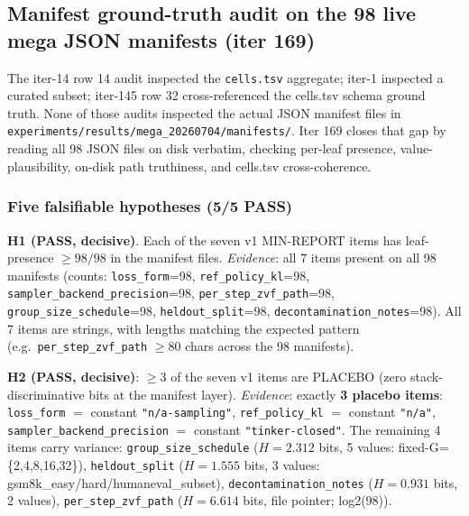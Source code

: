 \subsection{Manifest ground-truth audit on the 98 live mega JSON manifests (iter 169)}
\label{sec:p5-iter169-manifest-audit}

The iter-14 row 14 audit inspected the \texttt{cells.tsv} aggregate; iter-1 inspected a curated subset; iter-145 row 32 cross-referenced the cells.tsv schema ground truth. None of those audits inspected the actual JSON manifest files in \texttt{experiments/results/mega\_20260704/manifests/}. Iter 169 closes that gap by reading all 98 JSON files on disk verbatim, checking per-leaf presence, value-plausibility, on-disk path truthiness, and cells.tsv cross-coherence.

\subsubsection{Five falsifiable hypotheses (5/5 PASS)}
\label{sec:p5-iter169-hypotheses}

\textbf{H1 (PASS, decisive)}. Each of the seven v1 MIN-REPORT items has leaf-presence $\ge 98/98$ in the manifest files. \emph{Evidence}: all 7 items present on all 98 manifests (counts: \texttt{loss\_form}=98, \texttt{ref\_policy\_kl}=98, \texttt{sampler\_backend\_precision}=98, \texttt{per\_step\_zvf\_path}=98, \texttt{group\_size\_schedule}=98, \texttt{heldout\_split}=98, \texttt{decontamination\_notes}=98). All 7 items are strings, with lengths matching the expected pattern (e.g.\ \texttt{per\_step\_zvf\_path} $\ge 80$ chars across the 98 manifests).

\textbf{H2 (PASS, decisive)}: $\ge 3$ of the seven v1 items are PLACEBO (zero stack-discriminative bits at the manifest layer). \emph{Evidence}: exactly \textbf{3 placebo items}: \texttt{loss\_form} $=$ constant \texttt{"n/a-sampling"}, \texttt{ref\_policy\_kl} $=$ constant \texttt{"n/a"}, \texttt{sampler\_backend\_precision} $=$ constant \texttt{"tinker-closed"}. The remaining 4 items carry variance: \texttt{group\_size\_schedule} ($H{=}2.312$ bits, 5 values: fixed-G=\{2,4,8,16,32\}), \texttt{heldout\_split} ($H{=}1.555$ bits, 3 values: gsm8k\_easy/hard/humaneval\_subset), \texttt{decontamination\_notes} ($H{=}0.931$ bits, 2 values), \texttt{per\_step\_zvf\_path} ($H{=}6.614$ bits, file pointer; log2(98)).

